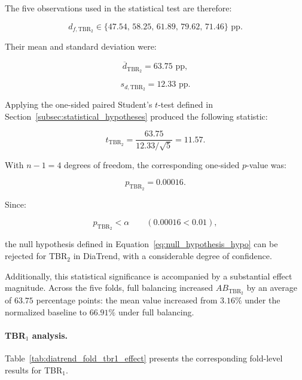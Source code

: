 The five observations used in the statistical test are therefore:

\begin{equation}
d_{f,\mathrm{TBR_2}}
\in
\{
47.54,\,
58.25,\,
61.89,\,
79.62,\,
71.46
\}
\text{ pp}.
\end{equation}

Their mean and standard deviation were:

\begin{equation}
\overline{d}_{\mathrm{TBR_2}}
=
63.75
\text{ pp},
\end{equation}

\begin{equation}
s_{d,\mathrm{TBR_2}}
=
12.33
\text{ pp}.
\end{equation}

Applying the one-sided paired Student's \(t\)-test defined in Section~\ref{subsec:statistical_hypotheses} produced the following statistic:

\begin{equation}
t_{\mathrm{TBR_2}}
=
\frac{63.75}{12.33/\sqrt{5}}
=
11.57.
\end{equation}

With \(n-1=4\) degrees of freedom, the corresponding one-sided \(p\)-value was:

\begin{equation}
p_{\mathrm{TBR_2}}
=
0.00016.
\end{equation}

Since:

\begin{equation}
p_{\mathrm{TBR_2}} < \alpha
\qquad
(0.00016 < 0.01),
\end{equation}

the null hypothesis defined in Equation~\ref{eq:null_hypothesis_hypo} can be rejected for TBR$_2$ in DiaTrend, with a considerable degree of confidence.

Additionally, this statistical significance is accompanied by a substantial effect magnitude. Across the five folds, full balancing increased \(AB_{\mathrm{TBR_2}}\) by an average of \(63.75\) percentage points: the mean value increased from \(3.16\%\) under the normalized baseline to \(66.91\%\) under full balancing.

\paragraph{TBR$_1$ analysis.}

Table~\ref{tab:diatrend_fold_tbr1_effect} presents the corresponding fold-level results for TBR$_1$.

